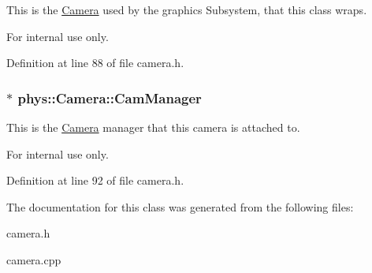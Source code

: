 This is the \hyperlink{classphys_1_1Camera}{Camera} used by the graphics Subsystem, that this class wraps. 

\begin{DoxyInternal}{For internal use only.}
\end{DoxyInternal}


Definition at line 88 of file camera.h.

\hypertarget{classphys_1_1Camera_a909203ede748deb1b587a8758ba8cec4}{
\subsubsection[{CamManager}]{$\ast$ {\bf phys::Camera::CamManager}}}
\label{d9/df8/classphys_1_1Camera_a909203ede748deb1b587a8758ba8cec4}


This is the \hyperlink{classphys_1_1Camera}{Camera} manager that this camera is attached to. 

\begin{DoxyInternal}{For internal use only.}
\end{DoxyInternal}


Definition at line 92 of file camera.h.



The documentation for this class was generated from the following files:\begin{DoxyCompactItemize}
\item 
camera.h\item 
camera.cpp\end{DoxyCompactItemize}
